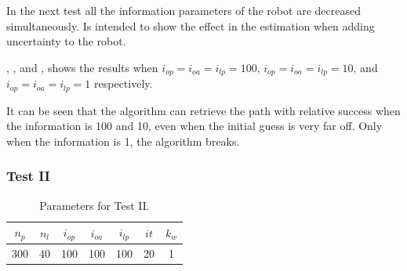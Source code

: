 In the next test all the information parameters of the robot are decreased simultaneously. Is intended to show the effect in the estimation when adding uncertainty to the robot.

, , and , shows the results when $i_{op}=i_{oa}=i_{lp}=100$, $i_{op}=i_{oa}=i_{lp}=10$, and $i_{op}=i_{oa}=i_{lp}=1$ respectively.

It can be seen that the algorithm can retrieve the path with relative success when the information is 100 and 10, even when the initial guess is very far off. Only when the information is 1, the algorithm breaks.

\subsubsection{Test II}
\label{sec:test-ii}

\begin{table}[htbp!]
    \centering
    \begin{tabular}{|c|c|c|c|c|c|c|}
        \hline
        $n_p$ & $n_l$ & $i_{op}$ & $i_{oa}$ & $i_{lp}$ & $it$ & $k_w$\\
        \hline \hline
        300 & 40 & 100 & 100 & 100 & 20 & 1\\
        \hline 
    \end{tabular}
    \caption{Parameters for Test II.}
    \label{tab:test-ii}
\end{table}

